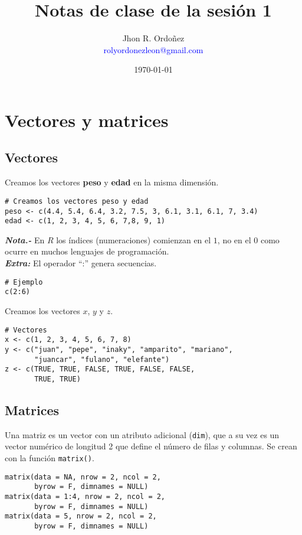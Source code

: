 \documentclass{article}
\title{Notas de clase de la sesión 1}
\author{
        Jhon R. Ordoñez \\
        \textcolor{blue}{rolyordonezleon@gmail.com}
    }
\date{\today}
\begin{document}
        \maketitle
        \thispagestyle{fancy}
    \section{Vectores y matrices}
       \subsection{Vectores}
       Creamos los vectores \textbf{peso} y \textbf{edad} en la misma dimensión.
\begin{lstlisting}
# Creamos los vectores peso y edad
peso <- c(4.4, 5.4, 6.4, 3.2, 7.5, 3, 6.1, 3.1, 6.1, 7, 3.4)
edad <- c(1, 2, 3, 4, 5, 6, 7,8, 9, 1)
\end{lstlisting}
    {\bf \it Nota.- } En $R$ los índices (numeraciones) comienzan en el $1$, no en el $0$ como ocurre en muchos lenguajes de programación. \\
    
    {\bf \it Extra:} El operador “:” genera secuencias.
\begin{lstlisting}
# Ejemplo
c(2:6)
\end{lstlisting}    
    	Creamos los vectores $x$, $y$  y $z$.
\begin{lstlisting}
# Vectores
x <- c(1, 2, 3, 4, 5, 6, 7, 8)
y <- c("juan", "pepe", "inaky", "amparito", "mariano",
	   "juancar", "fulano", "elefante")
z <- c(TRUE, TRUE, FALSE, TRUE, FALSE, FALSE, 
       TRUE, TRUE)
\end{lstlisting}    	
   
	\subsection{Matrices}     
		Una matriz es un vector con un atributo adicional (\verb|dim|), que a su vez es un vector numérico
		de longitud 2 que define el número de filas y columnas. Se crean con la función \verb|matrix()|.

\begin{lstlisting}
matrix(data = NA, nrow = 2, ncol = 2,
       byrow = F, dimnames = NULL) 
matrix(data = 1:4, nrow = 2, ncol = 2,
       byrow = F, dimnames = NULL)
matrix(data = 5, nrow = 2, ncol = 2, 
       byrow = F, dimnames = NULL)
\end{lstlisting}
\end{document}
